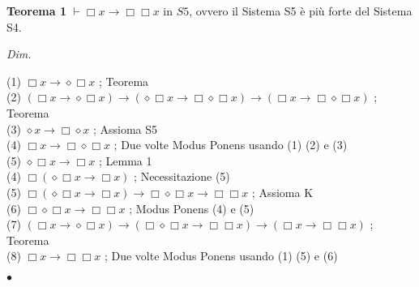 \documentclass[a4paper, titlepage, 12pt]{report}
\begin{document}
\begin{flushleft}
\textbf{Teorema 1}
$\vdash \Box x \rightarrow \Box \Box x$ in $S5$, ovvero il Sistema S5 è più forte del Sistema S4.

\textit{Dim.}

(1) $\Box x \rightarrow \diamond \Box x$ ; Teorema \\
(2) $(\Box x \rightarrow \diamond \Box x) \rightarrow (\diamond \Box x \rightarrow \Box\diamond\Box x) \rightarrow (\Box x \rightarrow \Box \diamond \Box x)$ ; Teorema \\
(3) $\diamond x \rightarrow \Box \diamond x$ ; Assioma S5 \\
(4) $\Box x \rightarrow \Box \diamond \Box x$ ; Due volte Modus Ponens usando (1) (2) e (3) \\
(5) $\diamond \Box x \rightarrow \Box x$ ; Lemma 1 \\
(4) $\Box (\diamond \Box x \rightarrow \Box x)$ ; Necessitazione (5) \\
(5) $\Box(\diamond\Box x \rightarrow \Box x) \rightarrow \Box \diamond \Box x \rightarrow \Box \Box x$ ; Assioma K \\
(6) $\Box\diamond\Box x \rightarrow \Box\Box x$ ; Modus Ponens (4) e (5) \\
(7) $(\Box x \rightarrow \diamond \Box x) \rightarrow (\Box\diamond\Box x \rightarrow \Box\Box x) \rightarrow (\Box x \rightarrow \Box\Box x)$ ; Teorema \\
(8) $\Box x \rightarrow \Box \Box x$ ; Due volte Modus Ponens usando (1) (5) e (6)

\begin{flushright}$\bullet$\end{flushright}
\end{flushleft}
\end{document}
